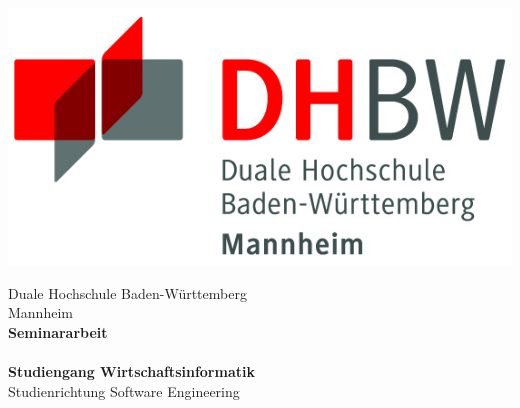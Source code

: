 \begin{titlepage}
\begin{minipage}{\textwidth}
		\vspace{-2cm}
		\begin{center}
			\includegraphics{img/logo.jpg}
		\end{center}
\end{minipage}
\vspace{1em}
\sffamily
\begin{center}
	\textsf{\large{}Duale Hochschule Baden-W\"urttemberg\\[1.5mm] Mannheim}\\[2em]
	\textsf{\textbf{\Large{}Seminararbeit}}\\[7mm]
	\textsf{\textbf{\Large{}\DerTitelDerArbeit}} \\[1.5cm]
	
	\textsf{\textbf{\Large{}Studiengang Wirtschaftsinformatik}\\[3mm] \textsf{Studienrichtung Software Engineering}}\\
	
	
	\vspace{3em}
\vfill

\begin{minipage}{\textwidth}


\end{minipage}
\end{center}
\end{titlepage}
